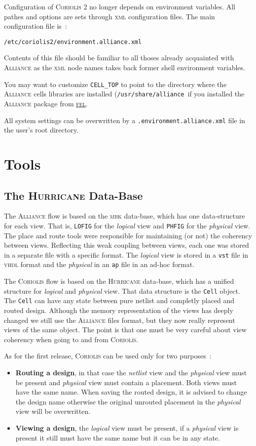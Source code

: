 \documentclass[11pt]{article}
\newcommand {\XML}                {\textsc{xml}\xspace}
\newcommand {\VHDL}               {\textsc{vhdl}\xspace}
\newcommand {\FEL}                {\href{http://spins.fedoraproject.org/fel/}{\textsc{fel}}\xspace}
\newcommand {\netlist}            {\textit{netlist}\xspace}
\newcommand {\physical}           {\textit{physical}\xspace}
\newcommand {\logical}            {\textit{logical}\xspace}
\newcommand {\Alliance}           {\textsc{Alliance}\xspace}
\newcommand {\MBK}                {\textsc{mbk}\xspace}
\newcommand {\vst}                {\texttt{vst}\xspace}
\newcommand {\ap}                 {\texttt{ap}\xspace}
\newcommand {\PHFIG}              {\texttt{PHFIG}\xspace}
\newcommand {\LOFIG}              {\texttt{LOFIG}\xspace}
\newcommand {\Coriolis}           {\textsc{Coriolis}\xspace}
\newcommand {\CoriolisII}         {\textsc{Coriolis 2}\xspace}
\newcommand {\Hurricane}          {\textsc{Hurricane}\xspace}
\newcommand {\CELLTOP}            {\texttt{CELL\_TOP}\xspace}
\newcommand {\confcoriolisIIalc}  {\texttt{/etc/coriolis2/environment.alliance.xml}\xspace}
\newcommand {\usercoriolisIIalc}  {\texttt{.environment.alliance.xml}\xspace}
\newcommand {\Cell}               {\texttt{Cell}\xspace}
\begin{document}
 Configuration of \CoriolisII no longer depends on environment variables.
 All pathes and options are sets through \XML configuration files. The main
 configuration file is~:
 \begin{center}
   \confcoriolisIIalc
 \end{center}
  Contents of this file should be familiar to all thoses already acquainted
  with \Alliance as the \XML node names takes back former shell environment
  variables.

  You may want to customize \CELLTOP to point to the directory where the \Alliance cells
  libraries are installed (\texttt{/usr/share/alliance}\ if you installed
  the \Alliance package from \FEL.

  All system settings can be overwritten by a \usercoriolisIIalc file in the
  user's root directory.


  \section{Tools}

  \subsection{The \Hurricane Data-Base}

  The \Alliance flow is based on the \MBK data-base, which has one data-structure
  for each view. That is, \LOFIG for the \logical view and \PHFIG for the \physical
  view. The place and route tools were responsible for maintaining (or not) the
  coherency between views. Reflecting this weak coupling between views, each one
  was stored in a separate file with a specific format. The \logical view is stored
  in a \vst file in \VHDL format and the \physical in an \ap file in an ad-hoc format.

  The \Coriolis flow is based on the \Hurricane data-base, which has a unified
  structure for \logical and \physical view. That data structure is the \Cell object.
  The \Cell can have any state between pure netlist and completly placed and
  routed design. Although the memory representation of the views has deeply
  changed we still use the \Alliance files format, but they now really represent
  views of the same object. The point is that one must be very careful about
  view coherency when going to and from \Coriolis.

  As for the first release, \Coriolis can be used only for two purposes~:
  \begin{itemize}
    \item \textbf{Routing a design}\xspace, in that case the \netlist\xspace
          view and the \physical view must be present and  \physical view must contain
          a placement. Both views must have the same name. When saving the routed design,
          it is advised to change the design name otherwise the original unrouted placement
          in the \physical view will be overwritten.
    \item \textbf{Viewing a design}, the \logical view must be present, if a \physical
          view is present it still must have the same name but it can be in any
          state. 
  \end{itemize}
\end{document}
